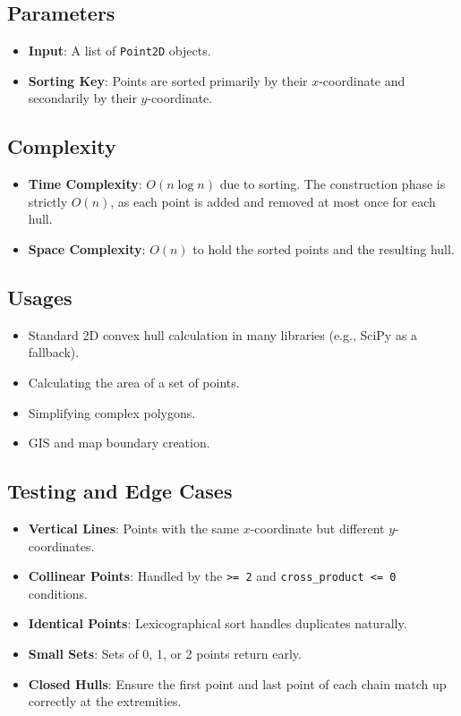 \subsection{Parameters}

\begin{itemize}
\item \textbf{Input}: A list of \texttt{Point2D} objects.
\item \textbf{Sorting Key}: Points are sorted primarily by their $x$-coordinate and secondarily by their $y$-coordinate.
\end{itemize}

\subsection{Complexity}

\begin{itemize}
\item \textbf{Time Complexity}: $O(n \log n)$ due to sorting. The construction phase is strictly $O(n)$, as each point is added and removed at most once for each hull.
\item \textbf{Space Complexity}: $O(n)$ to hold the sorted points and the resulting hull.
\end{itemize}

\subsection{Usages}

\begin{itemize}
\item Standard 2D convex hull calculation in many libraries (e.g., SciPy as a fallback).
\item Calculating the area of a set of points.
\item Simplifying complex polygons.
\item GIS and map boundary creation.
\end{itemize}

\subsection{Testing and Edge Cases}

\begin{itemize}
\item \textbf{Vertical Lines}: Points with the same $x$-coordinate but different $y$-coordinates.
\item \textbf{Collinear Points}: Handled by the \texttt{>= 2} and \texttt{cross\_product <= 0} conditions.
\item \textbf{Identical Points}: Lexicographical sort handles duplicates naturally.
\item \textbf{Small Sets}: Sets of 0, 1, or 2 points return early.
\item \textbf{Closed Hulls}: Ensure the first point and last point of each chain match up correctly at the extremities.
\end{itemize}

